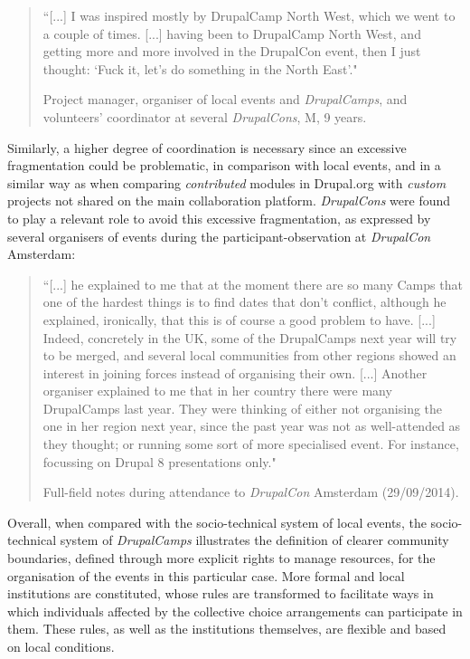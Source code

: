 \begin{quotation}
``[...] I was inspired mostly by DrupalCamp North West, which we went to a couple of times. [...] having been to DrupalCamp North West, and getting more and more involved in the DrupalCon event, then I just thought: `Fuck it, let's do something in the North East'."

\begin{flushright}\footnotesize{Project manager, organiser of local events and \textit{DrupalCamps}, and volunteers' coordinator at several \textit{DrupalCons}, M, 9 years.}\end{flushright}
\end{quotation}

Similarly, a higher degree of coordination is necessary since an excessive fragmentation could be problematic, in comparison with local events, and in a similar way as when comparing \textit{contributed} modules in Drupal.org with \textit{custom} projects not shared on the main collaboration platform. \textit{DrupalCons} were found to play a relevant role to avoid this excessive fragmentation, as expressed by several organisers of events during the participant-observation at \textit{DrupalCon} Amsterdam:

\begin{quotation}
``[...] he explained to me that at the moment there are so many Camps that one of the hardest things is to find dates that don't conflict, although he explained, ironically, that this is of course a good problem to have. [...] Indeed, concretely in the UK, some of the DrupalCamps next year will try to be merged, and several local communities from other regions showed an interest in joining forces instead of organising their own. [...] Another organiser explained to me that in her country there were many DrupalCamps last year. They were thinking of either not organising the one in her region next year, since the past year was not as well-attended as they thought; or running some sort of more specialised event. For instance, focussing on Drupal 8 presentations only."

\begin{flushright}\footnotesize{Full-field notes during attendance to \textit{DrupalCon} Amsterdam (29/09/2014).}\end{flushright}
\end{quotation}

Overall, when compared with the socio-technical system of local events, the socio-technical system of \textit{DrupalCamps} illustrates the definition of clearer community boundaries, defined through more explicit rights to manage resources, for the organisation of the events in this particular case. More formal and local institutions are constituted, whose rules are transformed to facilitate ways in which individuals affected by the collective choice arrangements can participate in them. These rules, as well as the institutions themselves, are flexible and based on local conditions.

